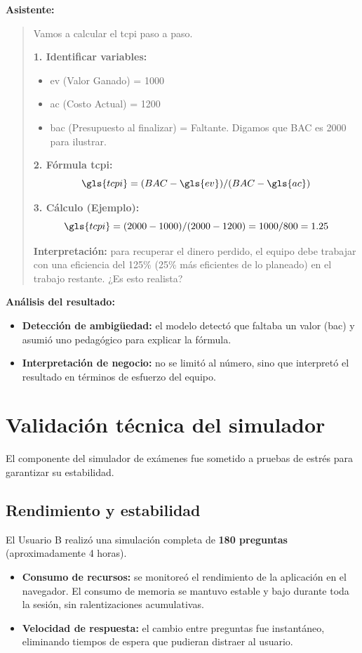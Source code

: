 \textbf{Asistente:}
\begin{list}{}{\leftmargin=1cm \rightmargin=1cm}
\item[]
\begin{quote}
Vamos a calcular el \gls{tcpi} paso a paso.

\textbf{1. Identificar variables:}
\begin{itemize}
\item \gls{ev} (Valor Ganado) = 1000
\item \gls{ac} (Costo Actual) = 1200
\item \gls{bac} (Presupuesto al finalizar) = Faltante. Digamos que BAC es 2000 para ilustrar.
\end{itemize}

\textbf{2. Fórmula \gls{tcpi}:}
\[ \gls{tcpi} = (BAC - \gls{ev}) / (BAC - \gls{ac}) \]

\textbf{3. Cálculo (Ejemplo):}
\[ \gls{tcpi} = (2000 - 1000) / (2000 - 1200) = 1000 / 800 = 1.25 \]

\textbf{Interpretación:} para recuperar el dinero perdido, el equipo debe trabajar con una eficiencia del 125\% (25\% más eficientes de lo planeado) en el trabajo restante. ¿Es esto realista?
\end{quote}
\end{list}

\textbf{Análisis del resultado:}
\begin{itemize}
\item   \textbf{Detección de ambigüedad:} el modelo detectó que faltaba un valor (\gls{bac}) y asumió uno pedagógico para explicar la fórmula.
\item   \textbf{Interpretación de negocio:} no se limitó al número, sino que interpretó el resultado en términos de esfuerzo del equipo.
\end{itemize}

\section{Validación técnica del simulador}

El componente del simulador de exámenes fue sometido a pruebas de estrés para garantizar su estabilidad.

\subsection{Rendimiento y estabilidad}
El Usuario B realizó una simulación completa de \textbf{180 preguntas} (aproximadamente 4 horas).
\begin{itemize}
\item   \textbf{Consumo de recursos:} se monitoreó el rendimiento de la aplicación en el navegador. El consumo de memoria se mantuvo estable y bajo durante toda la sesión, sin ralentizaciones acumulativas.
\item   \textbf{Velocidad de respuesta:} el cambio entre preguntas fue instantáneo, eliminando tiempos de espera que pudieran distraer al usuario.
\end{itemize}

